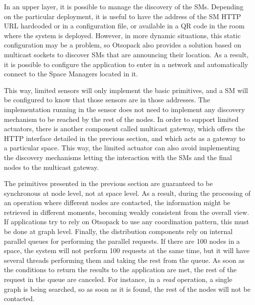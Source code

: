 In an upper layer, it is possible to manage the discovery of the SMs. Depending on the particular deployment, it is
useful to have the address of the SM HTTP URL hardcoded or in a configuration file, or available in a QR code in the
room where the system is deployed. However, in more dynamic situations, this static configuration may be a problem, so
Otsopack also provides a solution based on multicast sockets to discover SMs that are announcing their location.
As a result, it is possible to configure the application to enter in a network and automatically connect to the Space
Managers located in it.

This way, limited sensors will only implement the basic primitives, and a SM will be configured to know that those
sensors are in those addresses. The implementation running in the sensor does not need to implement any discovery
mechanism to be reached by the rest of the nodes. In order to support limited actuators, there is another component
called multicast gateway, which offers the HTTP interface detailed in the previous section, and which acts as a gateway
to a particular space. This way, the limited actuator can also avoid implementing the discovery mechanisms letting the
interaction with the SMs and the final nodes to the multicast gateway.

The primitives presented in the previous section are guaranteed to be synchronous at node level, not at space level.
As a result, during the processing of an operation where different nodes are contacted, the information might be
retrieved in different moments, becoming weakly consistent from the overall view. If applications try to rely on
Otsopack to use any coordination pattern, this must be done at graph level. Finally, the distribution components rely on
internal parallel queues for performing the parallel requests. If there are 100 nodes in a space, the system will not
perform 100 requests at the same time, but it will have several threads performing them and taking the rest from the
queue. As soon as the conditions to return the results to the application are met, the rest of the request in the queue
are canceled. For instance, in a \textit{read} operation, a single graph is being searched, so as soon as it is found,
the rest of the nodes will not be contacted.

% 
% 
% 
% 
% 

